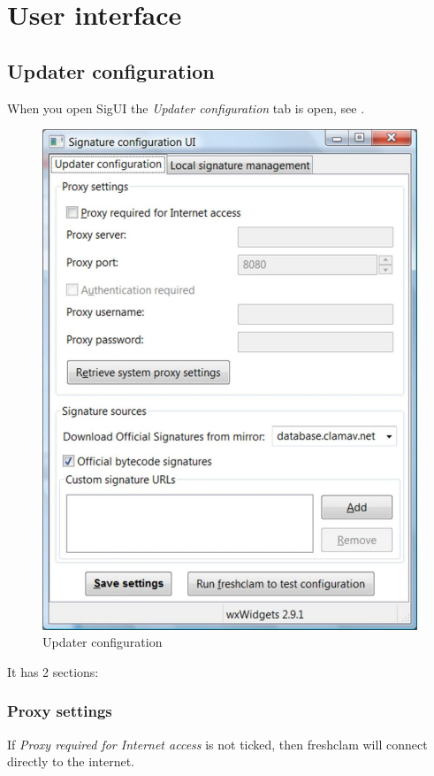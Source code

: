 \chapter{User interface}
\section{Updater configuration}
When you open SigUI the \emph{Updater configuration} tab is open, see .
\begin{figure}
\includegraphics{sigui_tab1.jpg}
\caption{Updater configuration}
\label{fig:tab1}
\end{figure}

It has 2 sections:
\subsection{Proxy settings}
If \emph{Proxy required for Internet access} is not ticked, then \gls{freshclam} will connect directly to the internet.

